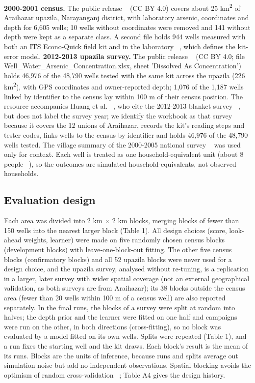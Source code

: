 \documentclass[sustainability,article,submit,pdftex,moreauthors]{Definitions/mdpi}
\begin{document}
\textbf{2000-2001 census.} The public release ~\cite{Jameel2021data} (CC BY 4.0) covers about 25 km\textsuperscript{2} of Araihazar upazila, Narayanganj district, with laboratory arsenic, coordinates and depth for 6,605 wells; 10 wells without coordinates were removed and 141 without depth were kept as a separate class. A second file holds 944 wells measured with both an ITS Econo-Quick field kit and in the laboratory ~\cite{vanGeen2014,Jameel2021}, which defines the kit-error model. \textbf{2012-2013 upazila survey.} The public release ~\cite{Knappett2024data} (CC BY 4.0; file Well\_Water\_Arsenic\_Concentration.xlsx, sheet 'Dissolved As Concentration') holds 46,976 of the 48,790 wells tested with the same kit across the upazila (226 km\textsuperscript{2}), with GPS coordinates and owner-reported depth; 1,076 of the 1,187 wells linked by identifier to the census lay within 100 m of their census position. The resource accompanies Huang et al. ~\cite{Huang2022}, who cite the 2012-2013 blanket survey ~\cite{vanGeen2014}, but does not label the survey year; we identify the workbook as that survey because it covers the 12 unions of Araihazar, records the kit's reading steps and tester codes, links wells to the census by identifier and holds 46,976 of the 48,790 wells tested. The village summary of the 2000-2005 national survey ~\cite{Jamil2019} was used only for context. Each well is treated as one household-equivalent unit (about 8 people ~\cite{Jamil2019}), so the outcomes are simulated household-equivalents, not observed households.

\subsection{Evaluation design}

Each area was divided into 2 km $\times$ 2 km blocks, merging blocks of fewer than 150 wells into the nearest larger block (Table 1). All design choices (score, look-ahead weights, learner) were made on five randomly chosen census blocks (development blocks) with leave-one-block-out fitting. The other five census blocks (confirmatory blocks) and all 52 upazila blocks were never used for a design choice, and the upazila survey, analysed without re-tuning, is a replication in a larger, later survey with wider spatial coverage (not an external geographical validation, as both surveys are from Araihazar); its 38 blocks outside the census area (fewer than 20 wells within 100 m of a census well) are also reported separately. In the final runs, the blocks of a survey were split at random into halves; the depth prior and the learner were fitted on one half and campaigns were run on the other, in both directions (cross-fitting), so no block was evaluated by a model fitted on its own wells. Splits were repeated (Table 1), and a run fixes the starting well and the kit draws. Each block's result is the mean of its runs. Blocks are the units of inference, because runs and splits average out simulation noise but add no independent observations. Spatial blocking avoids the optimism of random cross-validation ~\cite{Tziachris2023}; Table A4 gives the design history.
\end{document}
